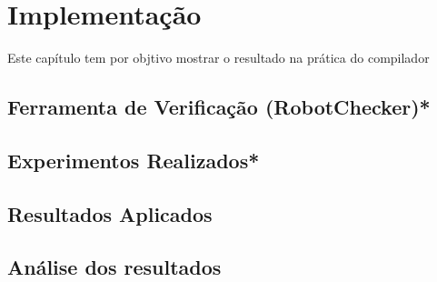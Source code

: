 \chapter{Implementação}

Este capítulo tem por objtivo mostrar o resultado na prática do compilador 

\section{Ferramenta de Verificação (RobotChecker)*}

\section{Experimentos Realizados*}

\section{Resultados Aplicados}

\section{Análise dos resultados}


